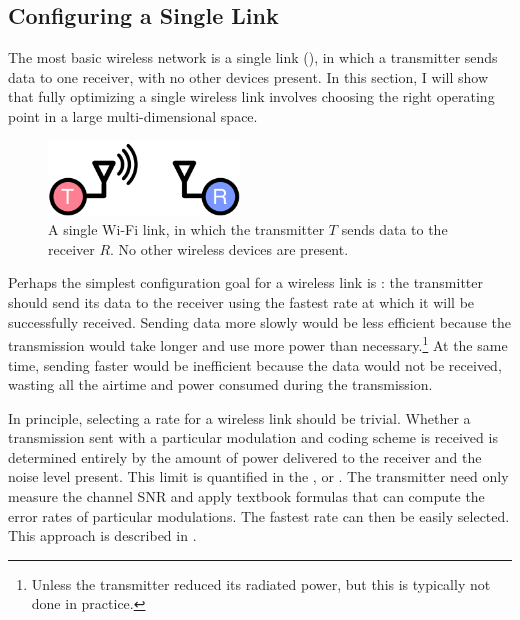 \subsection{Configuring a Single Link}
\label{sec:intro_single_link_problems}
The most basic wireless network is a single link (), in which a transmitter sends data to one receiver, with no other devices present. In this section, I will show that fully optimizing a single wireless link involves choosing the right operating point in a large multi-dimensional space. 

\begin{figure}[tp]
	\centering
	\includegraphics[width=2in]{figures/single_link_circle}
	\caption{\label{fig:wifi_link}A single Wi-Fi link, in which the transmitter $T$ sends data to the receiver $R$. No other wireless devices are present.}
\end{figure}

Perhaps the simplest configuration goal for a wireless link is : the transmitter should send its data to the receiver using the fastest rate at which it will be successfully received. Sending data more slowly would be less efficient because the transmission would take longer and use more power than necessary.\footnote{Unless the transmitter reduced its radiated power, but this is typically not done in practice.} At the same time, sending faster would be inefficient because the data would not be received, wasting all the airtime and power consumed during the transmission.

In principle, selecting a rate for a wireless link should be trivial. Whether a transmission sent with a particular modulation and coding scheme is received
is determined entirely by the amount of power delivered to the receiver and the noise level present. This limit is quantified in the , or .
The transmitter need only measure the channel SNR and apply textbook formulas that can compute the error rates of particular modulations. The fastest rate can then be easily selected. This approach is described in .

